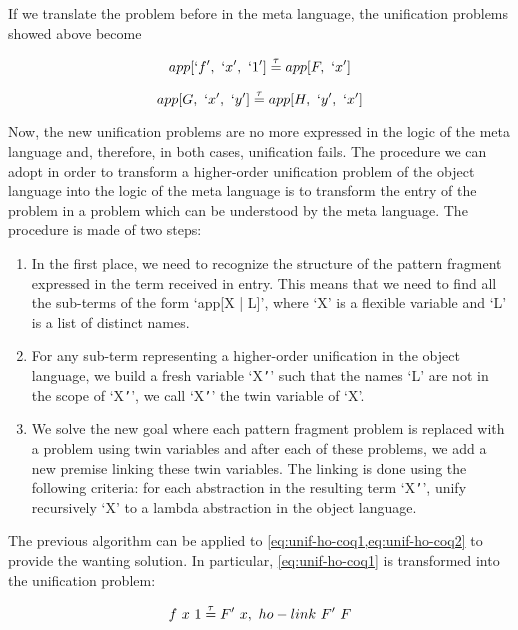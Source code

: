 \documentclass{rapport}
\begin{document}
If we translate the problem before in the meta language, the unification
problems showed above become

\begin{equation}
  app[`f',\ `x',\ `1'] \mathrel{\overset{\mathrm{\tau}}{=}} app[F,\ `x']
  \label{eq:unif-ho-elpi1}
\end{equation}

\begin{equation}
  app[G,\ `x',\ `y'] \eqtau app[H,\ `y',\ `x']
  \label{eq:unif-ho-elpi2}
\end{equation}

Now, the new unification problems are no more expressed in the logic of the
meta language and, therefore, in both cases, unification fails. The
procedure we can adopt in order to transform a higher-order unification problem
of the object language into the logic of the meta language is to transform
the entry of the problem in a problem which can be understood by the meta
language. The procedure is made of two steps:

\begin{enumerate}
  \item In the first place, we need to recognize the structure of the pattern
        fragment expressed in the term received in entry. This means that we
        need to find all the sub-terms of the form `app[X | L]', where `X' is
        a flexible variable and `L' is a list of distinct names.
  \item For any sub-term representing a higher-order unification in the object 
        language, we build a fresh variable `X\texttt{'}' such that the names 
        `L' are not in the scope of `X\texttt{'}', we call `X\texttt{'}' the 
        twin variable of `X'.
  \item We solve the new goal where each pattern fragment problem is replaced
        with a problem using twin variables and after each of these problems, we
        add a new premise linking these twin variables. The linking is done
        using the following criteria: for each abstraction in the resulting term
        `X\texttt{'}', unify recursively `X' to a lambda abstraction in the
        object language.
\end{enumerate}

The previous algorithm can be applied to \cref{eq:unif-ho-coq1,eq:unif-ho-coq2}
to provide the wanting solution. In particular, \cref{eq:unif-ho-coq1} is
transformed into the unification problem:

\begin{equation}
  f\ x\ 1 \mathrel{\overset{\mathrm{\tau}}{=}} F'\ x,\ ho-link\ F'\ F
  \label{eq:unif-ho-elpi1'}
\end{equation}
\end{document}
